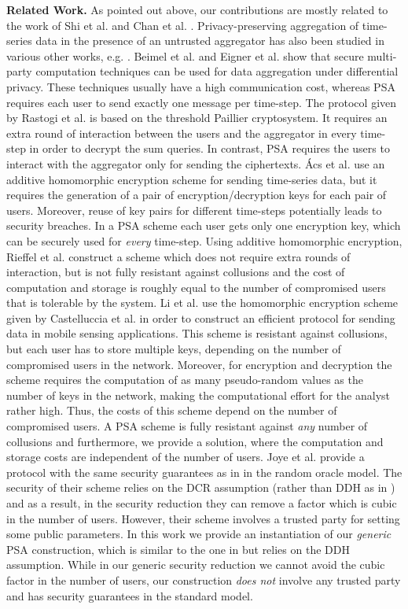 \documentclass[10pt]{extarticle}
\begin{document}
\noindent\textbf{Related Work.} As pointed out above, our contributions are mostly related to the work of Shi et al. \cite{2} and Chan et al. \cite{3}.
Privacy-preserving aggregation of time-series data in the presence of an untrusted aggregator has also been studied in various other works, e.g. \cite{4, 37, 33, 34, 38}. Beimel et al. \cite{4} and Eigner et al. \cite{37} show that secure multi-party computation techniques can be used for data aggregation under differential privacy. These techniques usually have a high communication cost, whereas PSA requires each user to send exactly one message per time-step. 
The protocol given by Rastogi et al. \cite{19} is based on the threshold Paillier cryptosystem. It requires an extra round of interaction between the users and the aggregator in every time-step in order to decrypt the sum queries. In contrast, PSA requires the users to interact with the aggregator only for sending the ciphertexts. \'{A}cs et al. \cite{36} use an additive homomorphic encryption scheme for sending time-series data, but it requires the generation of a pair of encryption/decryption keys for each pair of users. Moreover, reuse of key pairs for different time-steps potentially leads to security breaches. In a PSA scheme each user gets only one encryption key, which can be securely used for \textit{every} time-step. Using additive homomorphic encryption, Rieffel et al. \cite{35} construct a scheme which does not require extra rounds of interaction, but is not fully resistant against collusions and the cost of computation and storage is roughly equal to the number of compromised users that is tolerable by the system. 
Li et al. \cite{33,34} use the homomorphic encryption scheme given by Castelluccia et al. \cite{31,32} in order to construct an efficient protocol for sending data in mobile sensing applications. 
This scheme is resistant against collusions, but each user has to store multiple keys, depending on the number of compromised users in the network. Moreover, for encryption and decryption the scheme requires the computation of as many pseudo-random values as the number of keys in the network, making the computational effort for the analyst rather high. Thus, the costs of this scheme depend on the number of compromised users. 
A PSA scheme is fully resistant against \textit{any} number of collusions and furthermore, we provide a solution, where the computation and storage costs are independent of the number of users. Joye et al. \cite{38} provide a protocol with the same security guarantees as in \cite{2} in the random oracle model. The security of their scheme relies on the DCR assumption (rather than DDH as in \cite{2}) and as a result, in the security reduction they can remove a factor which is cubic in the number of users. However, their scheme involves a trusted party for setting some public parameters. In this work we provide an instantiation of our \textit{generic} PSA construction, which is similar to the one in \cite{38} but relies on the DDH assumption. While in our generic security reduction we cannot avoid the cubic factor in the number of users, our construction \textit{does not} involve any trusted party and has security guarantees in the standard model.
\end{document}
